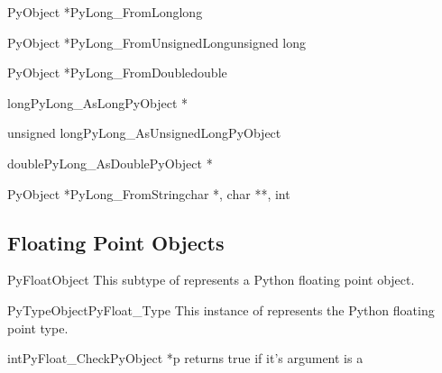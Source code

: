 \documentclass[twoside,openright]{report}
\begin{document}
\begin{cfuncdesc}{PyObject *}{PyLong_FromLong}{long}

\end{cfuncdesc}

\begin{cfuncdesc}{PyObject *}{PyLong_FromUnsignedLong}{unsigned long}

\end{cfuncdesc}

\begin{cfuncdesc}{PyObject *}{PyLong_FromDouble}{double}

\end{cfuncdesc}

\begin{cfuncdesc}{long}{PyLong_AsLong}{PyObject *}

\end{cfuncdesc}

\begin{cfuncdesc}{unsigned long}{PyLong_AsUnsignedLong}{PyObject }

\end{cfuncdesc}

\begin{cfuncdesc}{double}{PyLong_AsDouble}{PyObject *}

\end{cfuncdesc}

\begin{cfuncdesc}{PyObject *}{PyLong_FromString}{char *, char **, int}

\end{cfuncdesc}


\subsection{Floating Point Objects}

\begin{ctypedesc}{PyFloatObject}
This subtype of  represents a Python floating point object.
\end{ctypedesc}

\begin{cvardesc}{PyTypeObject}{PyFloat_Type}
This instance of  represents the Python floating 
point type.
\end{cvardesc}

\begin{cfuncdesc}{int}{PyFloat_Check}{PyObject *p}
returns true if it's argument is a 
\end{cfuncdesc}
\end{document}
